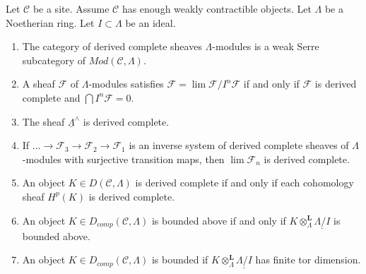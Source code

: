 \begin{proposition}
\label{proposition-enough-weakly-contractibles}
Let $\mathcal{C}$ be a site. Assume $\mathcal{C}$ has enough
weakly contractible objects.
Let $\Lambda$ be a Noetherian ring. Let $I \subset \Lambda$ be an ideal.
\begin{enumerate}
\item The category of derived complete sheaves $\Lambda$-modules is a
weak Serre subcategory of $\textit{Mod}(\mathcal{C}, \Lambda)$.
\item A sheaf $\mathcal{F}$ of $\Lambda$-modules satisfies
$\mathcal{F} = \lim \mathcal{F}/I^n\mathcal{F}$ if and only if
$\mathcal{F}$ is derived complete and $\bigcap I^n\mathcal{F} = 0$.
\item The sheaf $\underline{\Lambda}^\wedge$ is derived complete.
\item If $\ldots \to \mathcal{F}_3 \to \mathcal{F}_2 \to \mathcal{F}_1$
is an inverse system of derived complete sheaves of $\Lambda$-modules
with surjective transition maps, then $\lim \mathcal{F}_n$ is derived
complete.
\item An object $K \in D(\mathcal{C}, \Lambda)$ is derived complete if
and only if each cohomology sheaf $H^p(K)$ is derived complete.
\item An object $K \in D_{comp}(\mathcal{C}, \Lambda)$ is bounded above
if and only if $K \otimes_\Lambda^\mathbf{L} \underline{\Lambda/I}$
is bounded above.
\item An object $K \in D_{comp}(\mathcal{C}, \Lambda)$ is bounded
if $K \otimes_\Lambda^\mathbf{L} \underline{\Lambda/I}$ has finite
tor dimension.
\end{enumerate}
\end{proposition}

